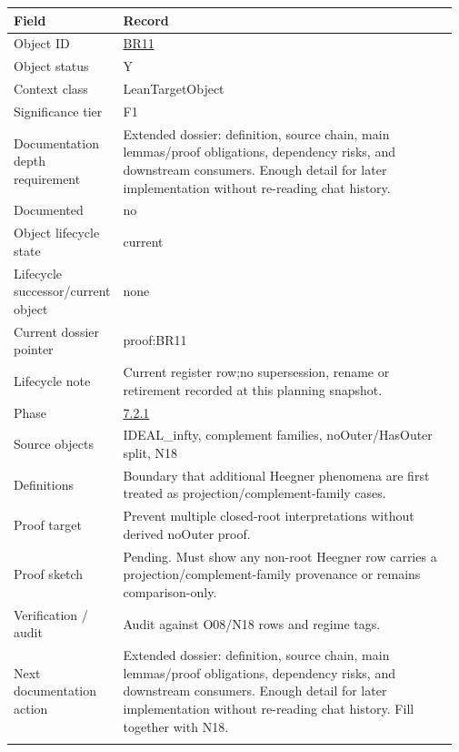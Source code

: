 \begin{longtable}{L{0.16\linewidth} L{0.81\linewidth}}
\hline
\textbf{Field} & \textbf{Record}\\
\hline
Object ID & \hyperlink{object-row-BR11}{BR11}\\
\hline\addlinespace[0.20em]
Object status & Y\\
\hline\addlinespace[0.20em]
Context class & LeanTargetObject\\
\hline\addlinespace[0.20em]
Significance tier & F1\\
\hline\addlinespace[0.20em]
Documentation depth requirement & Extended dossier: definition, source chain, main lemmas/\allowbreak{}proof obligations, dependency risks, and downstream consumers. Enough detail for later implementation without re-reading chat history.\\
\hline\addlinespace[0.20em]
Documented & no\\
\hline\addlinespace[0.20em]
Object lifecycle state & current\\
\hline\addlinespace[0.20em]
Lifecycle successor/\allowbreak{}current object & none\\
\hline\addlinespace[0.20em]
Current dossier pointer & proof:BR11\\
\hline\addlinespace[0.20em]
Lifecycle note & Current register row;\newline no supersession, rename or retirement recorded at this planning snapshot.\\
\hline\addlinespace[0.20em]
Phase & \hyperlink{phase-row-7-2-1}{7.2.1}\\
\hline\addlinespace[0.20em]
Source objects & IDEAL\_infty, complement families, noOuter/\allowbreak{}HasOuter split, N18\\
\hline\addlinespace[0.20em]
Definitions & Boundary that additional Heegner phenomena are first treated as projection/\allowbreak{}complement-family cases.\\
\hline\addlinespace[0.20em]
Proof target & Prevent multiple closed-root interpretations without derived noOuter proof.\\
\hline\addlinespace[0.20em]
Proof sketch & Pending. Must show any non-root Heegner row carries a projection/\allowbreak{}complement-family provenance or remains comparison-only.\\
\hline\addlinespace[0.20em]
Verification /\allowbreak{} audit & Audit against O08/\allowbreak{}N18 rows and regime tags.\\
\hline\addlinespace[0.20em]
Next documentation action & Extended dossier: definition, source chain, main lemmas/\allowbreak{}proof obligations, dependency risks, and downstream consumers. Enough detail for later implementation without re-reading chat history. Fill together with N18.\\
\hline\addlinespace[0.20em]
\end{longtable}
